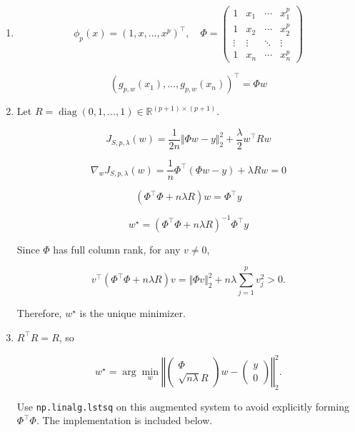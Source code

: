 \documentclass[11pt]{article}
\begin{document}
\begin{enumerate}
    \item[1. ]

    $$
    \phi_p(x) = (1, x, \dots, x^p)^\top
    ,\quad
    \Phi = \begin{pmatrix}
        1 & x_1 & \cdots & x_1^p \\
        1 & x_2 & \cdots & x_2^p \\
        \vdots & \vdots & \ddots & \vdots \\
        1 & x_n & \cdots & x_n^p
    \end{pmatrix}
    $$

    $$
    (g_{p,w}(x_1), \dots, g_{p,w}(x_n))^\top = \Phi w
    $$

    \item[2. ]

    Let $R = \operatorname{diag}(0, 1, \dots, 1) \in \mathbb{R}^{(p+1)\times(p+1)}$.

    $$
    J_{S,p,\lambda}(w) = \frac{1}{2n}\Vert \Phi w - y\Vert_2^2 + \frac{\lambda}{2}w^\top Rw
    $$

    $$
    \nabla_w J_{S,p,\lambda}(w)
    = \frac{1}{n}\Phi^\top(\Phi w-y) + \lambda Rw = 0
    $$

    $$
    (\Phi^\top\Phi + n\lambda R)w = \Phi^\top y
    $$

    $$
    w^\star = (\Phi^\top\Phi + n\lambda R)^{-1}\Phi^\top y
    $$

    Since $\Phi$ has full column rank, for any $v \neq 0$,

    $$
    v^\top(\Phi^\top\Phi + n\lambda R)v
    = \Vert\Phi v\Vert_2^2 + n\lambda\sum_{j=1}^p v_j^2 > 0.
    $$

    Therefore, $w^\star$ is the unique minimizer.

    \item[3. ]

    $R^\top R = R$, so

    $$
    w^\star = \arg\min_w
    \left\Vert
    \begin{pmatrix} \Phi \\ \sqrt{n\lambda}R \end{pmatrix}w
    - \begin{pmatrix} y \\ 0 \end{pmatrix}
    \right\Vert_2^2.
    $$

    Use \texttt{np.linalg.lstsq} on this augmented system to avoid explicitly forming $\Phi^\top\Phi$. The implementation is included below.
\end{enumerate}
\end{document}
